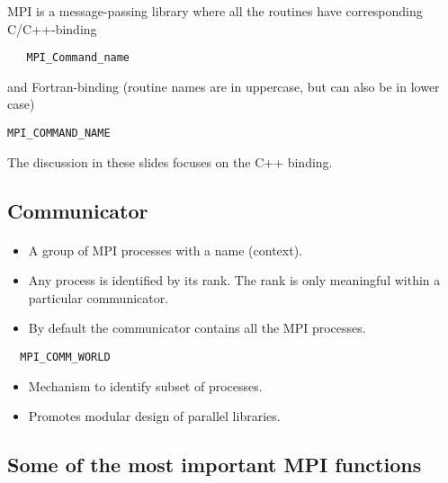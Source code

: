 \documentclass[%
oneside,                 %
final,                   %
10pt]{article}
\begin{document}
MPI is a message-passing library where all the routines
have corresponding C/C++-binding
\begin{verbatim}
   MPI_Command_name
\end{verbatim}
and Fortran-binding (routine names are in uppercase, but can also be in lower case)
\begin{Verbatim}[numbers=none,fontsize=\fontsize{9pt}{9pt},baselinestretch=0.95]
   MPI_COMMAND_NAME
\end{Verbatim}
The discussion in these slides focuses on the C++ binding.




\subsection*{Communicator}

\paragraph{}
\begin{itemize}
\item A group of MPI processes with a name (context).

\item Any process is identified by its rank. The rank is only meaningful within a particular communicator.

\item By default the communicator contains all the MPI processes.
\end{itemize}

\noindent
\begin{verbatim}
  MPI_COMM_WORLD 
\end{verbatim}
\begin{itemize}
\item Mechanism to identify subset of processes.

\item Promotes modular design of parallel libraries.
\end{itemize}

\noindent




\subsection*{Some of the most  important MPI functions}
\end{document}
